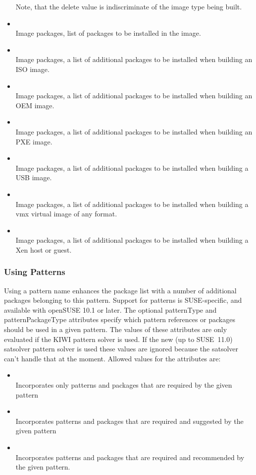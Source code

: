 \begin{itemize}
      Note, that the delete value is indiscriminate of the image type
      being built.
\item {}\\
      Image packages, list of packages to be installed in the image.
\item {}\\
      Image packages, a list of additional packages to be installed 
      when building an ISO image.
\item {}\\
      Image packages, a list of additional packages to be installed 
      when building an OEM image.
\item {}\\
      Image packages, a list of additional packages to be installed 
      when building an PXE image.
\item {}\\
      Image packages, a list of additional packages to be installed 
      when building a USB image.
\item {}\\
      Image packages, a list of additional packages to be installed 
      when building a vmx virtual image of any format.
\item {}\\
      Image packages, a list of additional packages to be installed 
      when building a Xen host or guest.
\end{itemize}

\subsubsection{Using Patterns}
Using a pattern name enhances the package list with a number of
additional packages belonging to this pattern. Support for patterns
is SUSE-specific, and available with open\-SUSE 10.1 or later.
The optional patternType and patternPackageType attributes specify
which pattern references or packages should be used in a given pattern.
The values of these attributes are only evaluated if the KIWI pattern
solver is used. If the new (up to SUSE~11.0) satsolver pattern solver
is used these values are ignored because the satsolver can't handle
that at the moment. Allowed values for the  attributes are:

\begin{itemize}
\item {}\\
      Incorporates only patterns and packages that are required by the
      given pattern
\item {}\\
      Incorporates patterns and packages that are required
      and suggested by the given pattern
\item {}\\
      Incorporates patterns and packages that are required and
      recommended by the given pattern.
\end{itemize}

